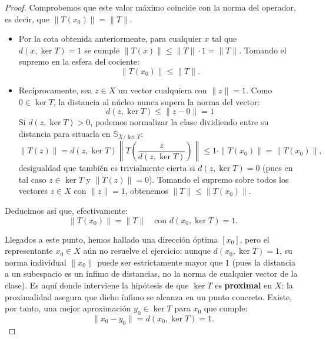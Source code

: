 \documentclass[12pt]{article}
\begin{document}
\begin{ejercicio}
\begin{proof}
            Comprobemos que este valor máximo coincide con la norma del operador, es decir, que $\|T(x_0)\| = \|T\|$.
            \begin{itemize}
                \item Por la cota obtenida anteriormente, para cualquier $x$ tal que $d(x, \ker T) = 1$ se cumple $\|T(x)\| \leq \|T\| \cdot 1 = \|T\|$. Tomando el supremo en la esfera del cociente:
                \begin{equation*}
                    \|T(x_0)\| \leq \|T\| .
                \end{equation*}
                \item Recíprocamente, sea $z \in X$ un vector cualquiera con $\|z\| = 1$. Como $0 \in \ker T$, la distancia al núcleo nunca supera la norma del vector: $$d(z, \ker T) \leq \|z - 0\| = 1$$
                Si $d(z, \ker T) > 0$, podemos normalizar la clase dividiendo entre su distancia para situarla en $\mathbb{S}_{X/\ker T}$:
                \begin{equation*}
                    \|T(z)\| = d(z, \ker T) \left\| T\left( \frac{z}{d(z, \ker T)} \right) \right\| \leq 1 \cdot \|T(x_0)\| = \|T(x_0)\|,
                \end{equation*}
                desigualdad que también es trivialmente cierta si $d(z, \ker T) = 0$ (pues en tal caso $z \in \ker T$ y $\|T(z)\| = 0$). Tomando el supremo sobre todos los vectores $z \in X$ con $\|z\| = 1$, obtenemos $\|T\| \leq \|T(x_0)\|$.
            \end{itemize}
            Deducimos así que, efectivamente:
            \begin{equation*}
                \|T(x_0)\| = \|T\| \quad \text{con } d(x_0, \ker T) = 1.
            \end{equation*}

            Llegados a este punto, hemos hallado una dirección óptima $[x_0]$, pero el representante $x_0 \in X$ aún no resuelve el ejercicio: aunque $d(x_0, \ker T) = 1$, su norma individual $\|x_0\|$ puede ser estrictamente mayor que $1$ (pues la distancia a un subespacio es un ínfimo de distancias, no la norma de cualquier vector de la clase). Es aquí donde interviene la hipótesis de que $\ker T$ es \textbf{proximal} en $X$: la proximalidad asegura que dicho ínfimo se alcanza en un punto concreto. Existe, por tanto, una mejor aproximación $y_0 \in \ker T$ para $x_0$ que cumple:
            \begin{equation*}
                \|x_0 - y_0\| = d(x_0, \ker T) = 1 .
            \end{equation*}


\end{proof}
\end{ejercicio}
\end{document}
